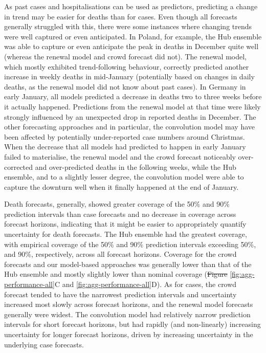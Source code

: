 \documentclass[10pt,letterpaper]{article}
\providecommand{\DIFaddtex}[1]{{\protect\color{blue}\uwave{#1}}} %
\providecommand{\DIFdeltex}[1]{{\protect\color{red}\sout{#1}}}                      %
\providecommand{\DIFaddbegin}{} %
\providecommand{\DIFaddend}{} %
\providecommand{\DIFdelbegin}{} %
\providecommand{\DIFdelend}{} %
\providecommand{\DIFadd}[1]{\texorpdfstring{\DIFaddtex{#1}}{#1}} %
\providecommand{\DIFdel}[1]{\texorpdfstring{\DIFdeltex{#1}}{}} %
\newcommand{\DIFscaledelfig}{0.5}
\newlength{\DIFdelgraphicswidth} %
\newlength{\DIFdelgraphicsheight} %
\newcommand{\DIFaddincludegraphics}[2][]{{\color{blue}\fbox{\DIFOincludegraphics[#1]{#2}}}} %
\newcommand{\DIFdelincludegraphics}[2][]{%
\sbox{\DIFdelgraphicsbox}{\DIFOincludegraphics[#1]{#2}}%
\settoboxwidth{\DIFdelgraphicswidth}{\DIFdelgraphicsbox} %
\settoboxtotalheight{\DIFdelgraphicsheight}{\DIFdelgraphicsbox} %
\scalebox{\DIFscaledelfig}{%
\parbox[b]{\DIFdelgraphicswidth}{\usebox{\DIFdelgraphicsbox}\\[-\baselineskip] \rule{\DIFdelgraphicswidth}{0em}}\llap{\resizebox{\DIFdelgraphicswidth}{\DIFdelgraphicsheight}{%
\setlength{\unitlength}{\DIFdelgraphicswidth}%
\begin{picture}(1,1)%
\thicklines\linethickness{2pt} %
{\color[rgb]{1,0,0}\put(0,0){\framebox(1,1){}}}%
{\color[rgb]{1,0,0}\put(0,0){\line( 1,1){1}}}%
{\color[rgb]{1,0,0}\put(0,1){\line(1,-1){1}}}%
\end{picture}%
}\hspace*{3pt}}} %
} %
\DeclareRobustCommand{\DIFaddbegin}{\DIFOaddbegin \let\includegraphics\DIFaddincludegraphics} %
\DeclareRobustCommand{\DIFaddend}{\DIFOaddend \let\includegraphics\DIFOincludegraphics} %
\DeclareRobustCommand{\DIFdelbegin}{\DIFOdelbegin \let\includegraphics\DIFdelincludegraphics} %
\DeclareRobustCommand{\DIFdelend}{\DIFOaddend \let\includegraphics\DIFOincludegraphics} %
\begin{document}
As past cases and hospitalisations can be used as predictors, predicting
a change in trend may be easier for deaths than for cases. Even though
all forecasts generally struggled with this, there were some instances
where changing trends were well captured or even anticipated. In Poland,
for example, the Hub ensemble was able to capture or even anticipate the
peak in deaths in December quite well (whereas the renewal model and
crowd forecast did not). The renewal model, which mostly exhibited
trend-following behaviour, correctly predicted another increase in
weekly deaths in mid-January (potentially based on changes in daily
deaths, as the renewal model did not know about past cases). In Germany
in early January, all models predicted a decrease in deaths two to three
weeks before it actually happened. Predictions from the renewal model at
that time were likely strongly influenced by an unexpected drop in
reported deaths in December. The other forecasting approaches and in
particular, the convolution model may have been affected by potentially
under-reported case numbers around Christmas. When the decrease that all
models had predicted to happen in early January failed to materialise,
the renewal model and the crowd forecast noticeably over-corrected and
over-predicted deaths in the following weeks, while the Hub ensemble,
and to a slightly lesser degree, the convolution model were able to
capture the downturn well when it finally happened at the end of
January.

Death forecasts, generally, showed greater coverage of the 50\% and 90\%
prediction intervals than case forecasts and no decrease in coverage
across forecast horizons, indicating that it might be easier to
appropriately quantify uncertainty for death forecasts. The Hub ensemble
had the greatest coverage, with empirical coverage of the 50\% and 90\%
prediction intervals exceeding 50\%, and 90\%, respectively, across all
forecast horizons. Coverage for the crowd forecasts and our model-based
approaches was generally lower than that of the Hub ensemble and mostly
slightly lower than nominal coverage (\DIFdelbegin \DIFdel{Figure
}\DIFdelend \DIFaddbegin \DIFadd{Figs
}\DIFaddend \ref{fig:agg-performance-all}C and \ref{fig:agg-performance-all}D). As
for cases, the crowd forecast tended to have the narrowest prediction
intervals and uncertainty increased most slowly across forecast
horizons, and the renewal model forecasts generally were widest. The
convolution model had relatively narrow prediction intervals for short
forecast horizons, but had rapidly (and non-linearly) increasing
uncertainty for longer forecast horizons, driven by increasing
uncertainty in the underlying case forecasts.
\end{document}

